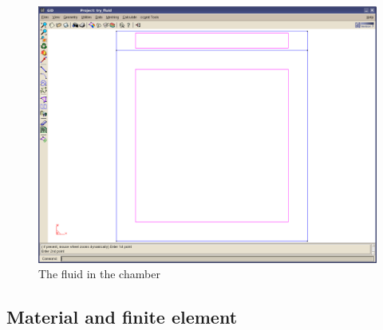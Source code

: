 %
\begin{figure}[h]
\includegraphics[scale=0.4]{Bilder/fluid_01}


\caption{\label{tut_fsi:4.1} The fluid in the chamber}
\end{figure}



\subsection{Material and finite element}

